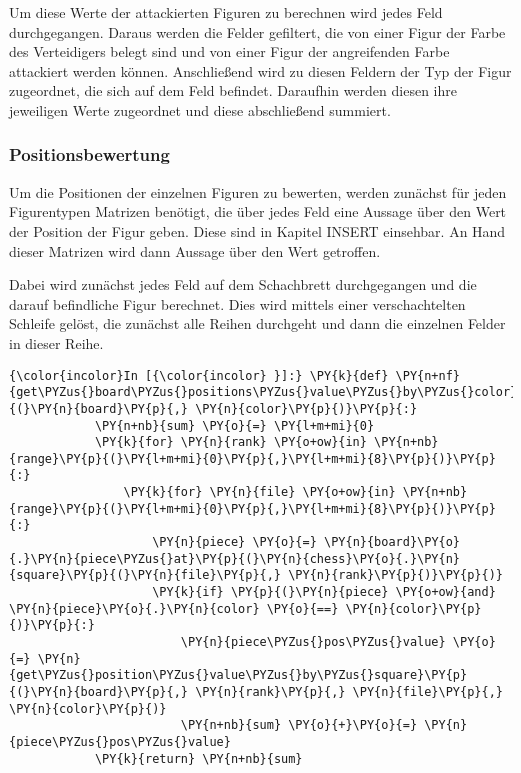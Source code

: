     Um diese Werte der attackierten Figuren zu berechnen wird jedes Feld
durchgegangen. Daraus werden die Felder gefiltert, die von einer Figur
der Farbe des Verteidigers belegt sind und von einer Figur der
angreifenden Farbe attackiert werden können. Anschließend wird zu diesen
Feldern der Typ der Figur zugeordnet, die sich auf dem Feld befindet.
Daraufhin werden diesen ihre jeweiligen Werte zugeordnet und diese
abschließend summiert.

    \subsubsection{Positionsbewertung}\label{positionsbewertung}

Um die Positionen der einzelnen Figuren zu bewerten, werden zunächst für
jeden Figurentypen Matrizen benötigt, die über jedes Feld eine Aussage
über den Wert der Position der Figur geben. Diese sind in Kapitel INSERT
einsehbar. An Hand dieser Matrizen wird dann Aussage über den Wert
getroffen.

Dabei wird zunächst jedes Feld auf dem Schachbrett durchgegangen und die
darauf befindliche Figur berechnet. Dies wird mittels einer
verschachtelten Schleife gelöst, die zunächst alle Reihen durchgeht und
dann die einzelnen Felder in dieser Reihe.

    \begin{Verbatim}[commandchars=\\\{\}]
{\color{incolor}In [{\color{incolor} }]:} \PY{k}{def} \PY{n+nf}{get\PYZus{}board\PYZus{}positions\PYZus{}value\PYZus{}by\PYZus{}color}\PY{p}{(}\PY{n}{board}\PY{p}{,} \PY{n}{color}\PY{p}{)}\PY{p}{:}
            \PY{n+nb}{sum} \PY{o}{=} \PY{l+m+mi}{0}
            \PY{k}{for} \PY{n}{rank} \PY{o+ow}{in} \PY{n+nb}{range}\PY{p}{(}\PY{l+m+mi}{0}\PY{p}{,}\PY{l+m+mi}{8}\PY{p}{)}\PY{p}{:}
                \PY{k}{for} \PY{n}{file} \PY{o+ow}{in} \PY{n+nb}{range}\PY{p}{(}\PY{l+m+mi}{0}\PY{p}{,}\PY{l+m+mi}{8}\PY{p}{)}\PY{p}{:}
                    \PY{n}{piece} \PY{o}{=} \PY{n}{board}\PY{o}{.}\PY{n}{piece\PYZus{}at}\PY{p}{(}\PY{n}{chess}\PY{o}{.}\PY{n}{square}\PY{p}{(}\PY{n}{file}\PY{p}{,} \PY{n}{rank}\PY{p}{)}\PY{p}{)}
                    \PY{k}{if} \PY{p}{(}\PY{n}{piece} \PY{o+ow}{and} \PY{n}{piece}\PY{o}{.}\PY{n}{color} \PY{o}{==} \PY{n}{color}\PY{p}{)}\PY{p}{:}
                        \PY{n}{piece\PYZus{}pos\PYZus{}value} \PY{o}{=} \PY{n}{get\PYZus{}position\PYZus{}value\PYZus{}by\PYZus{}square}\PY{p}{(}\PY{n}{board}\PY{p}{,} \PY{n}{rank}\PY{p}{,} \PY{n}{file}\PY{p}{,} \PY{n}{color}\PY{p}{)}
                        \PY{n+nb}{sum} \PY{o}{+}\PY{o}{=} \PY{n}{piece\PYZus{}pos\PYZus{}value}
            \PY{k}{return} \PY{n+nb}{sum}
\end{Verbatim}

